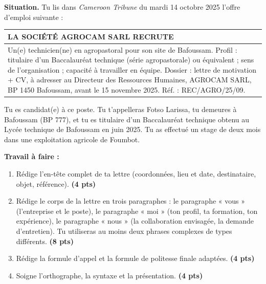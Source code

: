 \documentclass[11pt]{article}
\begin{document}
\begin{exercice}
\textbf{Situation.} Tu lis dans \emph{Cameroon Tribune} du mardi 14 octobre 2025 l'offre d'emploi suivante :

\begin{center}
\begin{tabularx}{\linewidth}{|X|}
\hline
\rowcolor{popblueL} \textbf{LA SOCIÉTÉ AGROCAM SARL RECRUTE} \\
\hline
Un(e) technicien(ne) en agropastoral pour son site de Bafoussam. Profil : titulaire d'un Baccalauréat technique (série agropastorale) ou équivalent ; sens de l'organisation ; capacité à travailler en équipe. Dossier : lettre de motivation + CV, à adresser au Directeur des Ressources Humaines, AGROCAM SARL, BP 1450 Bafoussam, avant le 15 novembre 2025. Réf. : REC/AGRO/25/09. \\
\hline
\end{tabularx}
\end{center}

Tu es candidat(e) à ce poste. Tu t'appelleras Fotso Larissa, tu demeures à Bafoussam (BP 777), et tu es titulaire d'un Baccalauréat technique obtenu au Lycée technique de Bafoussam en juin 2025. Tu as effectué un stage de deux mois dans une exploitation agricole de Foumbot.

\textbf{Travail à faire :}
\begin{enumerate}
\item Rédige l'en-tête complet de ta lettre (coordonnées, lieu et date, destinataire, objet, référence). \textbf{(4 pts)}
\item Rédige le corps de la lettre en trois paragraphes : le paragraphe « vous » (l'entreprise et le poste), le paragraphe « moi » (ton profil, ta formation, ton expérience), le paragraphe « nous » (la collaboration envisagée, la demande d'entretien). Tu utiliseras au moins deux phrases complexes de types différents. \textbf{(8 pts)}
\item Rédige la formule d'appel et la formule de politesse finale adaptées. \textbf{(4 pts)}
\item Soigne l'orthographe, la syntaxe et la présentation. \textbf{(4 pts)}
\end{enumerate}
\end{exercice}
\end{document}
